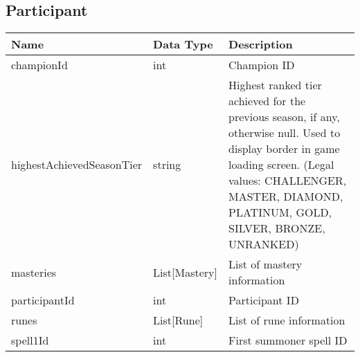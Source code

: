 \FloatBarrier
\subsection{Participant}
\begin{table}[!htb]
\footnotesize
\centering
\begin{tabular}{|llp{5cm}|}
\hline
\textbf{Name}             & \textbf{Data Type}  & \textbf{Description}                                                                                                                                                                                                                                     \\ \hline
championId                & int                 & Champion ID                                                                                                                                                                                                                                              \\ \hline
highestAchievedSeasonTier & string              & Highest ranked tier achieved for the previous season, if any, otherwise null. Used to display border in game loading screen. (Legal values: CHALLENGER, MASTER, DIAMOND, PLATINUM, GOLD, SILVER, BRONZE, UNRANKED)                                       \\ \hline
masteries                 & List{[}Mastery{]}   & List of mastery information                                                                                                                                                                                                                              \\ \hline
participantId             & int                 & Participant ID                                                                                                                                                                                                                                           \\ \hline
runes                     & List{[}Rune{]}      & List of rune information                                                                                                                                                                                                                                 \\ \hline
spell1Id                  & int                 & First summoner spell ID                                                                                                                                                                                                                                  \\ \hline

\end{tabular}
\end{table}
